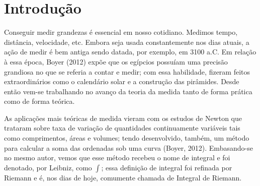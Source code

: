 




\chapter{Introdução}
    Conseguir medir grandezas é essencial em nosso cotidiano.
    Medimos tempo, distância, velocidade, etc.
    Embora seja usada constantemente nos dias atuais, a ação de medir é bem antiga sendo datada, por exemplo, em 3100 a.C.
    Em relação à essa época, Boyer (2012) expõe que os egípcios possuíam uma precisão grandiosa no que se referia a contar e medir;
    com essa habilidade, fizeram feitos extraordinários como o calendário solar e a construção das pirâmides.
    Desde então vem-se trabalhando no avanço da teoria da medida tanto de forma prática como de forma teórica.
    
    As aplicações mais teóricas de medida vieram com os estudos de Newton que trataram sobre taxa de variação de quantidades continuamente variáveis tais como
    comprimentos, áreas e volumes; tendo desenvolvido, também, um método para calcular a soma das ordenadas sob uma curva (Boyer, 2012). 
    Embasando-se no mesmo autor, vemos que esse método recebeu o nome de integral e foi denotado, por Leibniz, como $\int$; essa definição de integral foi refinada por Riemann e é, nos dias de hoje, comumente chamada de Integral de Riemann. 
    
